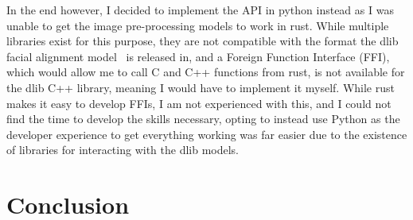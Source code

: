 \documentclass{report}
\begin{document}
In the end however, I decided to implement the API in python instead as I was unable to get the image pre-processing models to work in rust. While multiple libraries exist for this purpose, they are not compatible with the format the dlib facial alignment model~\cite{king2009dlib} is released in, and a Foreign Function Interface (FFI), which would allow me to call C and C++ functions from rust, is not available for the dlib C++ library, meaning I would have to implement it myself. While rust makes it easy to develop FFIs, I am not experienced with this, and I could not find the time to develop the skills necessary, opting to instead use Python as the developer experience to get everything working was far easier due to the existence of libraries for interacting with the dlib models.

\chapter{Conclusion}

\printbibliography
\end{document}
